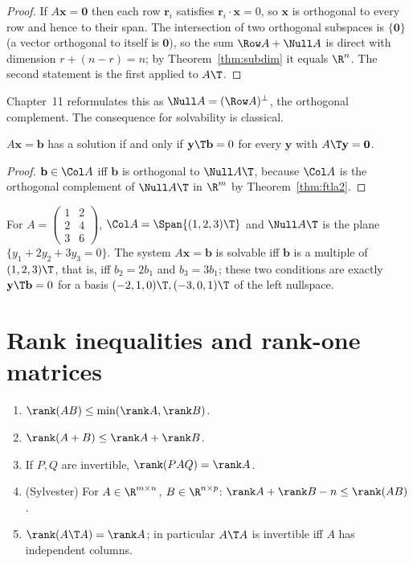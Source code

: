 \begin{proof}
If $A\mathbf{x}=\mathbf{0}$ then each row $\mathbf{r}_i$ satisfies $\mathbf{r}_i\cdot\mathbf{x}=0$, so $\mathbf{x}$ is orthogonal to every row and hence to their span. The intersection of two orthogonal subspaces is $\{\mathbf{0}\}$ (a vector orthogonal to itself is $\mathbf{0}$), so the sum $\Row A+\Null A$ is direct with dimension $r+(n-r)=n$; by Theorem~\ref{thm:subdim} it equals $\R^n$. The second statement is the first applied to $A\T$.
\end{proof}

Chapter~11 reformulates this as $\Null A=(\Row A)^\perp$, the orthogonal complement. The consequence for solvability is classical.

\begin{corollary}\label{cor:fredholm}
$A\mathbf{x}=\mathbf{b}$ has a solution if and only if $\mathbf{y}\T\mathbf{b}=0$ for every $\mathbf{y}$ with $A\T\mathbf{y}=\mathbf{0}$.
\end{corollary}

\begin{proof}
$\mathbf{b}\in\Col A$ iff $\mathbf{b}$ is orthogonal to $\Null A\T$, because $\Col A$ is the orthogonal complement of $\Null A\T$ in $\R^m$ by Theorem~\ref{thm:ftla2}.
\end{proof}

\begin{example}
For $A=\begin{pmatrix}1&2\\2&4\\3&6\end{pmatrix}$, $\Col A=\Span\{(1,2,3)\T\}$ and $\Null A\T$ is the plane $\{y_1+2y_2+3y_3=0\}$. The system $A\mathbf{x}=\mathbf{b}$ is solvable iff $\mathbf{b}$ is a multiple of $(1,2,3)\T$, that is, iff $b_2=2b_1$ and $b_3=3b_1$; these two conditions are exactly $\mathbf{y}\T\mathbf{b}=0$ for a basis $(-2,1,0)\T,(-3,0,1)\T$ of the left nullspace.
\end{example}

\section{Rank inequalities and rank-one matrices}

\begin{proposition}\label{prop:rankineq}
\begin{enumerate}[label=(\roman*)]
  \item $\rank(AB)\le\min(\rank A,\rank B)$.
  \item $\rank(A+B)\le\rank A+\rank B$.
  \item If $P,Q$ are invertible, $\rank(PAQ)=\rank A$.
  \item (Sylvester) For $A\in\R^{m\times n}$, $B\in\R^{n\times p}$: $\rank A+\rank B-n\le\rank(AB)$.
  \item $\rank(A\T A)=\rank A$; in particular $A\T A$ is invertible iff $A$ has independent columns.
\end{enumerate}
\end{proposition}

